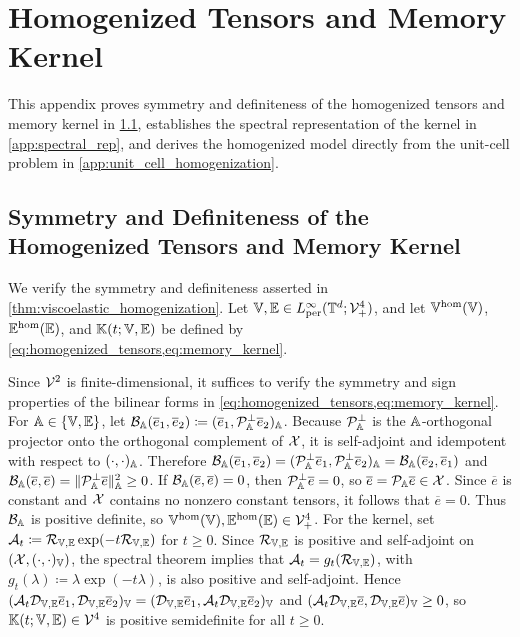 \section{Homogenized Tensors and Memory Kernel}

This appendix proves symmetry and definiteness of the homogenized tensors and memory kernel in \cref{app:homogenized_tensors_kernel_properties}, establishes the spectral representation of the kernel in \cref{app:spectral_rep}, and derives the homogenized model directly from the unit-cell problem in \cref{app:unit_cell_homogenization}.

\subsection{Symmetry and Definiteness of the Homogenized Tensors and Memory Kernel}\label{app:homogenized_tensors_kernel_properties}
We verify the symmetry and definiteness asserted in \cref{thm:viscoelastic_homogenization}. Let $\mathbb{V},\mathbb{E}\in L^{\infty}_{\mathrm{per}}(\mathbb{T}^d;{\mathcal{V}}^4_{+})$, and let $\mathbb{V}^{\mathrm{hom}}(\mathbb{V})$, $\mathbb{E}^{\mathrm{hom}}(\mathbb{E})$, and $\mathbb{K}(t;\mathbb{V},\mathbb{E})$ be defined by \cref{eq:homogenized_tensors,eq:memory_kernel}.

Since ${\mathcal{V}}^{2}$ is finite-dimensional, it suffices to verify the symmetry and sign properties of the bilinear forms in \cref{eq:homogenized_tensors,eq:memory_kernel}. For $\mathbb{A}\in\{\mathbb{V},\mathbb{E}\}$, let ${\mathcal{B}}_{\mathbb{A}}(\overline e_1,\overline e_2)\coloneqq(\overline e_1,{\mathcal{P}}_{\mathbb{A}}^{\perp}\overline e_2)_{\mathbb{A}}$. Because ${\mathcal{P}}_{\mathbb{A}}^{\perp}$ is the $\mathbb{A}$-orthogonal projector onto the orthogonal complement of ${\mathcal{X}}$, it is self-adjoint and idempotent with respect to $(\cdot,\cdot)_{\mathbb{A}}$. Therefore ${\mathcal{B}}_{\mathbb{A}}(\overline e_1,\overline e_2)=({\mathcal{P}}_{\mathbb{A}}^{\perp}\overline e_1,{\mathcal{P}}_{\mathbb{A}}^{\perp}\overline e_2)_{\mathbb{A}}={\mathcal{B}}_{\mathbb{A}}(\overline e_2,\overline e_1)$ and ${\mathcal{B}}_{\mathbb{A}}(\overline e,\overline e)=\|{\mathcal{P}}_{\mathbb{A}}^{\perp}\overline e\|_{\mathbb{A}}^{2}\geq 0$. If ${\mathcal{B}}_{\mathbb{A}}(\overline e,\overline e)=0$, then ${\mathcal{P}}_{\mathbb{A}}^{\perp}\overline e=0$, so $\overline e={\mathcal{P}}_{\mathbb{A}}\overline e\in {\mathcal{X}}$. Since $\overline e$ is constant and ${\mathcal{X}}$ contains no nonzero constant tensors, it follows that $\overline e=0$. Thus ${\mathcal{B}}_{\mathbb{A}}$ is positive definite, so $\mathbb{V}^{\mathrm{hom}}(\mathbb{V}),\mathbb{E}^{\mathrm{hom}}(\mathbb{E})\in {\mathcal{V}}^4_{+}$. For the kernel, set ${\mathcal{A}}_t\coloneqq{\mathcal{R}}_{\mathbb{V},\mathbb{E}}\exp(-t{\mathcal{R}}_{\mathbb{V},\mathbb{E}})$ for $t\ge 0$. Since ${\mathcal{R}}_{\mathbb{V},\mathbb{E}}$ is positive and self-adjoint on $({\mathcal{X}},(\cdot,\cdot)_{\mathbb{V}})$, the spectral theorem implies that ${\mathcal{A}}_t=g_t({\mathcal{R}}_{\mathbb{V},\mathbb{E}})$, with $g_t(\lambda)\coloneqq\lambda \exp(-t\lambda)$, is also positive and self-adjoint. Hence $({\mathcal{A}}_t{\mathcal{D}}_{\mathbb{V},\mathbb{E}}\overline e_1,{\mathcal{D}}_{\mathbb{V},\mathbb{E}}\overline e_2)_{\mathbb{V}}=({\mathcal{D}}_{\mathbb{V},\mathbb{E}}\overline e_1,{\mathcal{A}}_t{\mathcal{D}}_{\mathbb{V},\mathbb{E}}\overline e_2)_{\mathbb{V}}$ and $({\mathcal{A}}_t{\mathcal{D}}_{\mathbb{V},\mathbb{E}}\overline e,{\mathcal{D}}_{\mathbb{V},\mathbb{E}}\overline e)_{\mathbb{V}}\ge 0$, so $\mathbb{K}(t;\mathbb{V},\mathbb{E})\in {\mathcal{V}}^{4}$ is positive semidefinite for all $t\ge 0$.
